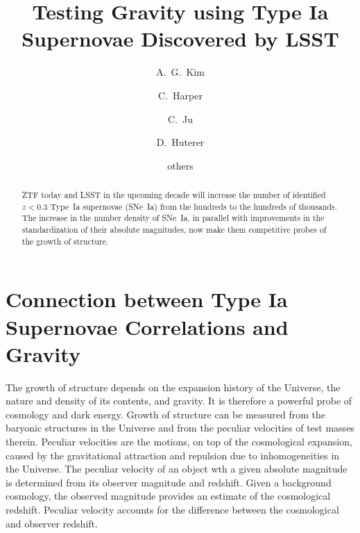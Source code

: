 \documentclass{aastex62}   	%
\begin{document}
\title{Testing Gravity using Type Ia Supernovae Discovered by LSST}
\author[0000-0001-6315-8743]{A.~G.~Kim}
\author{C.~Harper}
\author{C.~Ju}
\author{D.~Huterer}

\author{others}


\begin{abstract}
ZTF today and LSST in the upcoming decade will increase the number of identified  $z<0.3$ Type~Ia supernovae (SNe~Ia)  from the hundreds to the
hundreds of thousands.  The increase in the number density of SNe~Ia, in parallel with improvements in the standardization of
their absolute magnitudes, now make them competitive probes of the growth of structure.
\end{abstract}

\section{Connection between Type Ia Supernovae Correlations and Gravity}

The growth of structure depends on the expansion history of the Universe, the nature and density of its contents, and gravity. 
It is therefore a powerful probe of cosmology and dark energy.  Growth of structure can be measured from the baryonic structures
in the Universe and from the peculiar velocities of test masses therein.
Peculiar velocities are the motions, on top of the cosmological expansion, caused by the gravitational attraction
and repulsion due to inhomogeneities in the Universe.  The peculiar velocity of an object wth a given absolute magnitude
is determined from its observer magnitude and redshift.  Given a background cosmology, the observed magnitude provides
an estimate of the cosmological redshift.  Peculiar velocity accounts for the difference between the cosmological and observer redshift.
\end{document}
